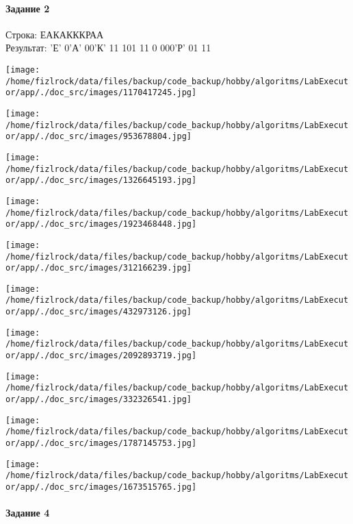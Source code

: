 \documentclass[a4paper, 12pt]{article}
\begin{document}
\paragraph{Задание 2}

Строка: 
ЕАКАКККРАА\\
Результат: 'Е' 0'А' 00'К' 11 101 11 0 000'Р' 01 11

\texttt{[image: /home/fizlrock/data/files/backup/code\_backup/hobby/algoritms/LabExecutor/app/./doc\_src/images/1170417245.jpg]}

\texttt{[image: /home/fizlrock/data/files/backup/code\_backup/hobby/algoritms/LabExecutor/app/./doc\_src/images/953678804.jpg]}

\texttt{[image: /home/fizlrock/data/files/backup/code\_backup/hobby/algoritms/LabExecutor/app/./doc\_src/images/1326645193.jpg]}

\texttt{[image: /home/fizlrock/data/files/backup/code\_backup/hobby/algoritms/LabExecutor/app/./doc\_src/images/1923468448.jpg]}

\texttt{[image: /home/fizlrock/data/files/backup/code\_backup/hobby/algoritms/LabExecutor/app/./doc\_src/images/312166239.jpg]}

\texttt{[image: /home/fizlrock/data/files/backup/code\_backup/hobby/algoritms/LabExecutor/app/./doc\_src/images/432973126.jpg]}

\texttt{[image: /home/fizlrock/data/files/backup/code\_backup/hobby/algoritms/LabExecutor/app/./doc\_src/images/2092893719.jpg]}

\texttt{[image: /home/fizlrock/data/files/backup/code\_backup/hobby/algoritms/LabExecutor/app/./doc\_src/images/332326541.jpg]}

\texttt{[image: /home/fizlrock/data/files/backup/code\_backup/hobby/algoritms/LabExecutor/app/./doc\_src/images/1787145753.jpg]}

\texttt{[image: /home/fizlrock/data/files/backup/code\_backup/hobby/algoritms/LabExecutor/app/./doc\_src/images/1673515765.jpg]}
\pagebreak
\paragraph{Задание 4}
\end{document}
